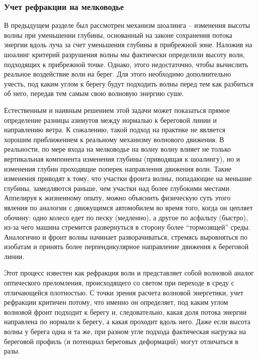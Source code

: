 
\subsubsection{Учет рефракции на мелководье}
\label{sec:wave_refraction}

В предыдущем разделе был рассмотрен механизм шоалинга -- изменения высоты волны при уменьшении глубины, основанный на законе сохранения потока энергии вдоль луча за счет уменьшения глубины в прибрежной зоне. 
Наложив на шоалинг критерий разрушения волны мы фактически определили высоту волн, подходящих к прибрежной точке. 
Однако, этого недостаточно, чтобы вычислить реальное воздействие волн на берег.
Для этого необходимо дополнительно учесть, под каким углом к берегу будут подходить волны перед тем как разбиться об него, передав тем самым свою волновую энергию суше. 

Естественным и наивным решением этой задачи может показаться прямое определение разницы азимутов между нормалью к береговой линии и направлению ветра.
К сожалению, такой подход на практике не является хорошим приближением к реальному механизму волнового движения. 
В реальности, по мере входа на мелководье на волну волну влияет не только вертикальная компонента изменения глубины (приводящая к шоалингу), но и изменения глубин проходящие поперек направления движения волн.
Такие изменения приводят к тому, что участки фронта волны, попадающие на меньшие глубины, замедляются раньше, чем участки над более глубокими местами. 
Аппелируя к жизненному опыту, можно объяснить физическую суть этого явления по аналогии с движущимся автомобилем во время того, когда он цепляет обочину: одно колесо едет по песку (медленно), а другое по асфальту (быстро), из-за чего машина стремится развернуться в сторону более \enquote{тормозящей} среды.
Аналогично и фронт волны начинает разворачиваться, стремясь выровняться по изобатам и принять более перпендикулярное направление движения к береговой линии. 

Этот процесс известен как рефракция волн и представляет собой волновой аналог оптического преломления, происходящего со светом при переходе в среду с отличающейся плотностью.
С точки зрения расчета волновой энергетики, учет рефракции критичен потому, что именно он определяет, под каким углом волновой фронт подходит к берегу и, следовательно, какая доля потока энергии направлена по нормали к берегу, а какая проходит вдоль него. 
Даже если высота волны у берега одна и та же, при разном угле подхода фактическая нагрузка на береговой профиль (и потенциал береговых деформаций) могут отличаться в разы. 

